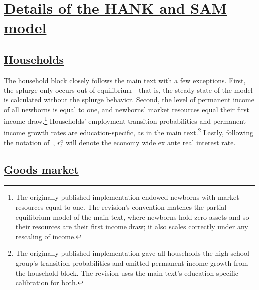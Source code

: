 \documentclass[\latexroot/\projectname]{subfiles}
\begin{document}
\FloatBarrier

\section{\href{\WebBase\#sec:appendix-hank}{Details of the HANK and SAM model}}
\whenintegrated{\label{sec:appendix-hank}} %


\subsection{\href{\WebBase\#sec:hank-households}{Households}}\whenintegrated{\label{sec:hank-households}}

The household block closely follows the main text with a few exceptions. First, the splurge only occurs out of equilibrium---that is, the steady state of the model is calculated without the splurge behavior. Second, the level of permanent income of all newborns is equal to one, and newborns' market resources equal their first income draw.\footnote{The originally published implementation endowed newborns with market resources equal to one. The revision's convention matches the partial-equilibrium model of the main text, where newborns hold zero assets and so their resources are their first income draw; it also scales correctly under any rescaling of income.} Households' employment transition probabilities and permanent-income growth rates are education-specific, as in the main text.\footnote{The originally published implementation gave all households the high-school group's transition probabilities and omitted permanent-income growth from the household block. The revision uses the main text's education-specific calibration for both.} Lastly, following the notation of~\cite{arsJumpsHumps}, $r^{a}_{t}$ will denote the economy wide ex ante real interest rate.

\subsection{\href{\WebBase\#sec:goods-market}{Goods market}}\whenintegrated{\label{sec:goods-market}}
\end{document}
